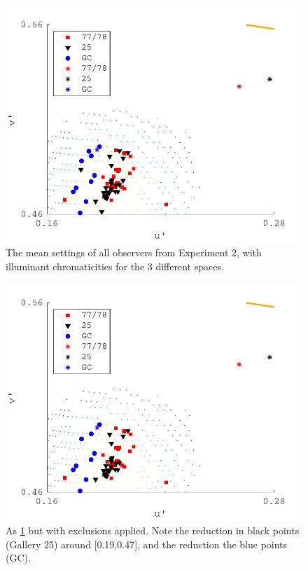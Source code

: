 \begin{figure}[hbtp] 
\includegraphics[max width=\textwidth]{figs/tablet/exp2_withoutExclusion.pdf} 
\caption{The mean settings of all observers from Experiment 2, with illuminant chromaticities for the 3 different spaces.}
\label{fig:exp2wo}
\end{figure}

\begin{figure}[hbtp] 
\includegraphics[max width=\textwidth]{figs/tablet/exp2.pdf} 
\caption{As \ref{fig:exp2wo} but with exclusions applied. Note the reduction in black points (Gallery 25) around [0.19,0.47], and the reduction the blue points (GC).}
\label{fig:exp2}
\end{figure}

